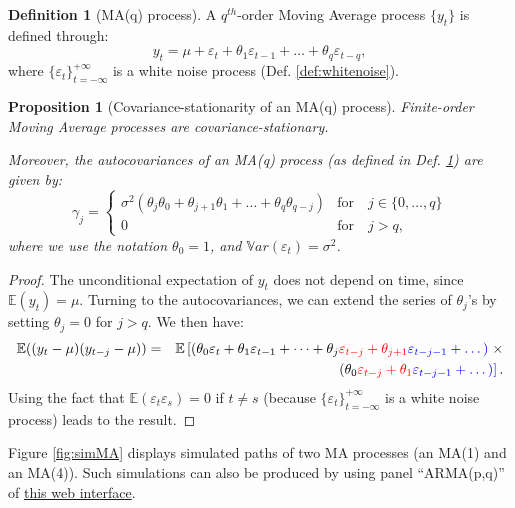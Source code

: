 \documentclass[
  12pt,
]{book}
\newtheorem{proposition}{Proposition}[chapter]
\theoremstyle{definition}
\newtheorem{definition}{Definition}[chapter]
\theoremstyle{definition}
\theoremstyle{definition}
\theoremstyle{definition}
\theoremstyle{remark}
\begin{document}
\begin{definition}[MA(q) process]
\protect\hypertarget{def:MAq}{}\label{def:MAq}A \(q^{th}\)-order Moving Average process \(\{y_t\}\) is defined through:
\[
y_t = \mu + \varepsilon_t + \theta_1 \varepsilon_{t-1} + \dots + \theta_q \varepsilon_{t-q},
\]
where \(\{\varepsilon_t\}_{t = -\infty}^{+\infty}\) is a white noise process (Def. \ref{def:whitenoise}).
\end{definition}

\begin{proposition}[Covariance-stationarity of an MA(q) process]
\protect\hypertarget{prp:covMAq}{}\label{prp:covMAq}Finite-order Moving Average processes are covariance-stationary.

Moreover, the autocovariances of an MA(q) process (as defined in Def. \ref{def:MAq}) are given by:
\begin{equation}
\gamma_j = \left\{ \begin{array}{ll} \sigma^2(\theta_j\theta_0 + \theta_{j+1}\theta_{1} +  \dots + \theta_{q}\theta_{q-j}) &\mbox{for} \quad j \in \{0,\dots,q\} \\ 0 &\mbox{for} \quad j>q, \end{array} \right.\label{eq:autocovMA}
\end{equation}
where we use the notation \(\theta_0=1\), and \(\mathbb{V}ar(\varepsilon_t)=\sigma^2\).
\end{proposition}

\begin{proof}
The unconditional expectation of \(y_t\) does not depend on time, since \(\mathbb{E}(y_t)=\mu\). Turning to the autocovariances, we can extend the series of \(\theta_j\)'s by setting \(\theta_j=0\) for \(j>q\). We then have:
\begin{eqnarray*}
\mathbb{E}((y_t-\mu)(y_{t-j}-\mu)) &=& \mathbb{E}\left[(\theta_0 \varepsilon_t +\theta_1 \varepsilon_{t-1} + \dots +\theta_j \color{red}{\varepsilon_{t-j}}+\theta_{j+1} \color{blue}{\varepsilon_{t-j-1}} + \dots) \right.\times \\
&&\left. (\theta_0 \color{red}{\varepsilon_{t-j}} +\theta_1 \color{blue}{\varepsilon_{t-j-1}} + \dots)\right].
\end{eqnarray*}
Using the fact that \(\mathbb{E}(\varepsilon_t\varepsilon_s)=0\) if \(t \ne s\) (because \(\{\varepsilon_t\}_{t = -\infty}^{+\infty}\) is a white noise process) leads to the result.
\end{proof}

Figure \ref{fig:simMA} displays simulated paths of two MA processes (an MA(1) and an MA(4)). Such simulations can also be produced by using panel ``ARMA(p,q)'' of \href{https://jrenne.shinyapps.io/MacroEc/}{this web interface}.
\end{document}
